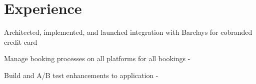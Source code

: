 \documentclass[]{plushcv}
\begin{document}
\begin{minipage}[t]{0.25\textwidth}
    
    
    \end{minipage} 
\hfill
\begin{minipage}[t]{0.7\textwidth} 


\section{Experience}
\vspace{\topsep} %
\begin{tightemize}
\sectionsep
\item Architected, implemented, and launched integration with Barclays for cobranded credit card \angular \\
\item Manage booking processes on all platforms for all bookings \angular - \graphql \\
\item Build and A/B test enhancements to application \angular - \graphql \\
\end{tightemize}
\sectionsep



\end{minipage}
\end{document}
